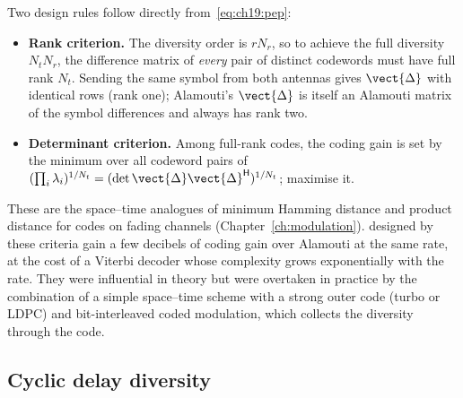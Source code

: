 Two design rules follow directly from~\eqref{eq:ch19:pep}:
\begin{itemize}
\item \textbf{Rank criterion.} The diversity order is $rN_r$, so to achieve the full diversity
$N_tN_r$, the difference matrix of \emph{every} pair of distinct codewords must have full rank
$N_t$. Sending the same symbol from both antennas gives $\vect{\Delta}$ with identical rows (rank
one); Alamouti's $\vect{\Delta}$ is itself an Alamouti matrix of the symbol differences and always
has rank two.
\item \textbf{Determinant criterion.} Among full-rank codes, the coding gain is set by the minimum
over all codeword pairs of $(\prod_i\lambda_i)^{1/N_t}=(\det\vect{\Delta}\vect{\Delta}^{\mathsf H})^{1/N_t}$;
maximise it.
\end{itemize}
These are the space--time analogues of minimum Hamming distance and product distance for codes
on fading channels (Chapter~\ref{ch:modulation}).  designed by these
criteria gain a few decibels of coding gain over Alamouti at the same rate, at the cost of a
Viterbi decoder whose complexity grows exponentially with the rate. They were influential in theory
but were overtaken in practice by the combination of a simple space--time scheme with a strong
outer code (turbo or LDPC) and bit-interleaved coded modulation, which collects the diversity
through the code.


\subsection{Cyclic delay diversity}

